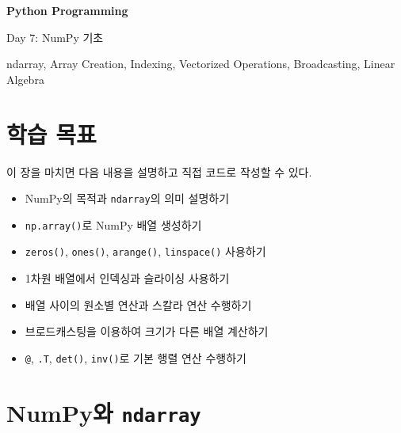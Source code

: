 \documentclass[11pt,a4paper]{article}
\begin{document}
\begin{titlepage}
    \centering
    \vspace*{3cm}

    {\Huge\bfseries Python Programming\par}
    \vspace{0.8cm}
    {\LARGE Day 7: NumPy 기초\par}

    \vspace{2cm}

    {\large ndarray, Array Creation, Indexing, Vectorized Operations, Broadcasting, Linear Algebra\par}

    \vfill
\end{titlepage}

\tableofcontents
\newpage

\section{학습 목표}

\begin{learningbox}
이 장을 마치면 다음 내용을 설명하고 직접 코드로 작성할 수 있다.
\begin{itemize}[leftmargin=1.5em]
    \item NumPy의 목적과 \texttt{ndarray}의 의미 설명하기
    \item \texttt{np.array()}로 NumPy 배열 생성하기
    \item \texttt{zeros()}, \texttt{ones()}, \texttt{arange()}, \texttt{linspace()} 사용하기
    \item 1차원 배열에서 인덱싱과 슬라이싱 사용하기
    \item 배열 사이의 원소별 연산과 스칼라 연산 수행하기
    \item 브로드캐스팅을 이용하여 크기가 다른 배열 계산하기
    \item \texttt{@}, \texttt{.T}, \texttt{det()}, \texttt{inv()}로 기본 행렬 연산 수행하기
\end{itemize}
\end{learningbox}

\section{NumPy와 \texttt{ndarray}}
\end{document}
